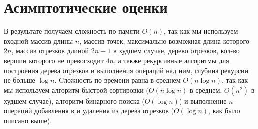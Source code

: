 \documentclass[12pt]{article}
\begin{document}
\section{Асимптотические оценки}
В результате получаем сложность по памяти $O(n)$, так как мы используем входной массив длины $n$, массив точек, максимально возможная длина которого $2n$, массив отрезков длиной $2n - 1$ в худшем случае, дерево отрезков, кол-во вершин которого не превосходит $4n$, а также рекурсивные алгоритмы для построения дерева отрезков и выполнения операций над ним, глубина рекурсии не больше $\log n$. Cложность по времени равна в среднем $O(n \log n)$, так как мы используем алгоритм быстрой сортировки ($O(n \log n)$ в среднем, $O(n^2)$ в худшем случае), алгоритм бинарного поиска ($O(\log n)$) и выполнение $n$ операций добавления в и удаления из дерева отрезков ($O(\log n)$, как было описано выше).
\end{document}
